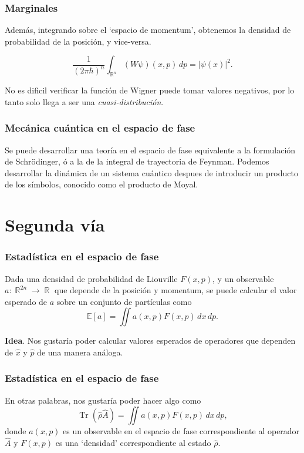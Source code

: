 \documentclass{beamer}
\DeclareMathOperator{\R}{\mathbb{R}}
\DeclareMathOperator{\Tr}{Tr}
\begin{document}
\begin{frame}
  \frametitle{Marginales}

  Además, integrando sobre el `espacio de momentum',
  obtenemos la densidad de probabilidad de la posición, y
  vice-versa.

  \begin{equation}
    \frac{1}{(2\pi\hbar)^{n}} \int_{\R^{n}} (W\psi)(x,p) \,
    dp
    = |\psi(x)|^2.
  \end{equation}

  No es dificil verificar la función de Wigner puede tomar
  valores negativos, por lo tanto solo llega a ser una
  \textit{cuasi-distribución}.
\end{frame}

\begin{frame}
  \frametitle{Mecánica cuántica en el espacio de fase}

  Se puede desarrollar una teoría en el espacio de fase
  equivalente a la formulación de Schrödinger, ó a la de la
  integral de trayectoria de Feynman. Podemos desarrollar la
  dinámica de un sistema cuántico despues de introducir un
  producto de los símbolos, conocido como el producto de
  Moyal.
\end{frame}

\section{Segunda vía}

\begin{frame}
  \frametitle{Estadística en el espacio de fase}

  Dada una densidad de probabilidad de Liouville $F(x,p)$, y
  un observable $a : \R^{2n} \to \R$ que depende de la
  posición y momentum, se puede calcular el valor esperado
  de $a$ sobre un conjunto de partículas como
  \begin{equation}
    \mathbb E[a]
    = \iint a(x,p) F(x,p) \, dx \, dp.
  \end{equation}

  \textbf{Idea}. Nos gustaría poder calcular valores
  esperados de operadores que dependen de $\hat{x}$ y
  $\hat{p}$ de una manera análoga.
\end{frame}

\begin{frame}
  \frametitle{Estadística en el espacio de fase}

  En otras palabras, nos gustaría poder hacer algo como
  \begin{equation}
    \Tr\left( \hat{\rho}\hat{A} \right) 
    = \iint a(x,p) F(x,p) \, dx \, dp,
  \end{equation}
  donde $a(x,p)$ es un observable en el espacio de fase
  correspondiente al operador $\hat{A}$ y $F(x,p)$ es una
  `densidad' correspondiente al estado $\hat{\rho}$.
\end{frame}
\end{document}
